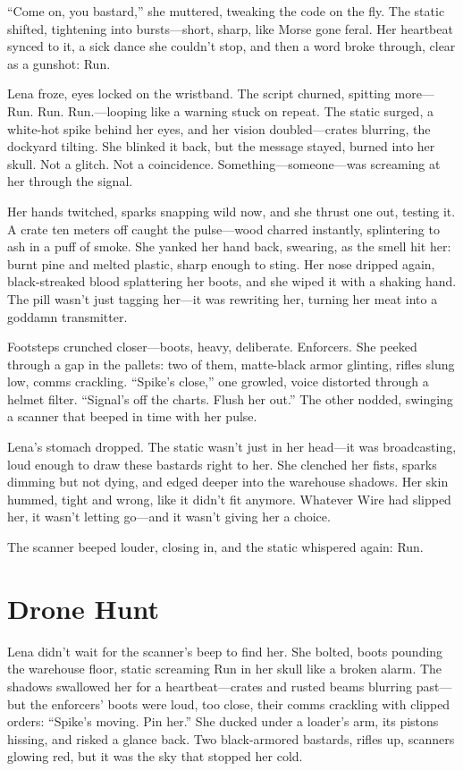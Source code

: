 \documentclass[12pt]{book}
\begin{document}
``Come on, you bastard,'' she muttered, tweaking the code on the fly. The static shifted, tightening into bursts---short, sharp, like Morse gone feral. Her heartbeat synced to it, a sick dance she couldn’t stop, and then a word broke through, clear as a gunshot: Run.

Lena froze, eyes locked on the wristband. The script churned, spitting more---Run. Run. Run.---looping like a warning stuck on repeat. The static surged, a white-hot spike behind her eyes, and her vision doubled---crates blurring, the dockyard tilting. She blinked it back, but the message stayed, burned into her skull. Not a glitch. Not a coincidence. Something---someone---was screaming at her through the signal.

Her hands twitched, sparks snapping wild now, and she thrust one out, testing it. A crate ten meters off caught the pulse---wood charred instantly, splintering to ash in a puff of smoke. She yanked her hand back, swearing, as the smell hit her: burnt pine and melted plastic, sharp enough to sting. Her nose dripped again, black-streaked blood splattering her boots, and she wiped it with a shaking hand. The pill wasn’t just tagging her---it was rewriting her, turning her meat into a goddamn transmitter.

Footsteps crunched closer---boots, heavy, deliberate. Enforcers. She peeked through a gap in the pallets: two of them, matte-black armor glinting, rifles slung low, comms crackling. ``Spike’s close,'' one growled, voice distorted through a helmet filter. ``Signal’s off the charts. Flush her out.'' The other nodded, swinging a scanner that beeped in time with her pulse.

Lena’s stomach dropped. The static wasn’t just in her head---it was broadcasting, loud enough to draw these bastards right to her. She clenched her fists, sparks dimming but not dying, and edged deeper into the warehouse shadows. Her skin hummed, tight and wrong, like it didn’t fit anymore. Whatever Wire had slipped her, it wasn’t letting go---and it wasn’t giving her a choice.

The scanner beeped louder, closing in, and the static whispered again: Run.

\section{Drone Hunt}

Lena didn’t wait for the scanner’s beep to find her. She bolted, boots pounding the warehouse floor, static screaming Run in her skull like a broken alarm. The shadows swallowed her for a heartbeat—crates and rusted beams blurring past—but the enforcers’ boots were loud, too close, their comms crackling with clipped orders: “Spike’s moving. Pin her.” She ducked under a loader’s arm, its pistons hissing, and risked a glance back. Two black-armored bastards, rifles up, scanners glowing red, but it was the sky that stopped her cold.
\end{document}
